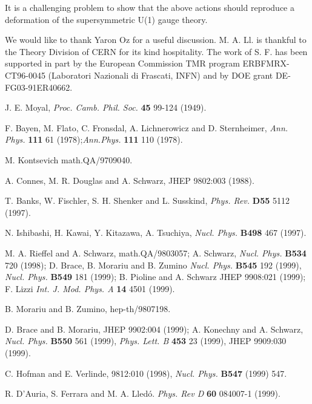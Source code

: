 \documentclass[a4paper,12pt]{article}
\begin{document}
It is a challenging problem to show that the above actions should
reproduce a deformation 
of the supersymmetric U(1) gauge theory.

\vfill\eject
{}

\bigskip

We would like to thank Yaron Oz for a useful discussion.
M. A. Ll. is thankful to the Theory Division of CERN for its kind
hospitality. 
The work of S. F. has been supported in part by the European Commission
TMR program
ERBFMRX-CT96-0045 (Laboratori Nazionali di Frascati, INFN) and by DOE
grant DE-
FG03-91ER40662.

\begin{thebibliography}{100}

   J. E. Moyal, {\it Proc. Camb. Phil. Soc.} {\bf 45} 99-124
(1949).

 F. Bayen, M. Flato, C. Fronsdal, A. Lichnerowicz and  D.
Sternheimer, {\it  Ann. Phys.} {\bf 111} 61 (1978);{\it  Ann.Phys.} {\bf
111}
 110 (1978).

  M. Kontsevich math.QA/9709040.

 A. Connes, M. R. Douglas and A. Schwarz,   JHEP 9802:003
(1988).

 T. Banks, W. Fischler, S. H. Shenker and L. Susskind, {\it
Phys. Rev.}
{\bf D55} 5112 (1997).

 N. Ishibashi, H. Kawai, Y. Kitazawa, A. Tsuchiya, {\it
Nucl. Phys.} 
{\bf B498} 467 (1997).


 M. A. Rieffel and A. Schwarz, math.QA/9803057; A. Schwarz,
{\it Nucl. Phys.} 
{\bf B534} 720 (1998); D. Brace, B. Morariu and B. Zumino {\it Nucl.
Phys.} {\bf
 B545} 192 (1999), {\it Nucl. Phys.} {\bf
 B549} 181 (1999); B. Pioline and A. Schwarz JHEP 9908:021 (1999); F.
Lizzi
{\it Int. J. Mod. Phys. A } {\bf 14} 4501 (1999).  


 B. Morariu and B. Zumino, hep-th/9807198.

 D. Brace and B. Morariu,  JHEP 9902:004 (1999); A. Konechny
and A. Schwarz,
{\it Nucl. Phys.} {\bf B550} 561 (1999), 
{\it Phys. Lett. B} {\bf 453} 23  (1999), JHEP 9909:030 (1999).


 C. Hofman and E. Verlinde,  9812:010 (1998), {\it Nucl.
Phys.} {\bf B547}
(1999) 547.

 R. D'Auria, S. Ferrara and M. A. Lled\'o. {\it Phys. Rev D}
{\bf 60 } 084007-1  (1999).


\end{thebibliography}
\end{document}

